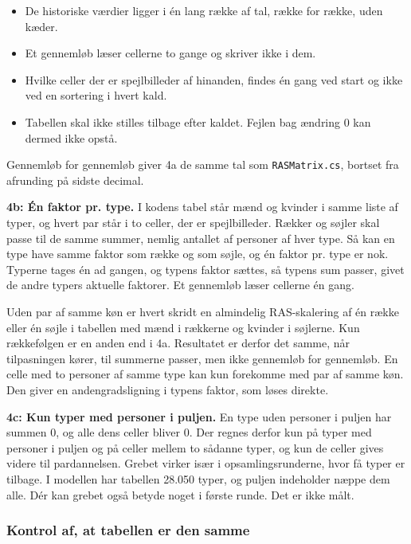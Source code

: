 \documentclass[11pt,a4paper]{article}
\newcommand{\kode}[1]{\texttt{#1}}
\begin{document}
\begin{itemize}
\item De historiske værdier ligger i én lang række af tal, række for række, uden kæder.
\item Et gennemløb læser cellerne to gange og skriver ikke i dem.
\item Hvilke celler der er spejlbilleder af hinanden, findes én gang ved start og ikke ved en
sortering i hvert kald.
\item Tabellen skal ikke stilles tilbage efter kaldet. Fejlen bag ændring 0 kan dermed ikke opstå.
\end{itemize}

Gennemløb for gennemløb giver 4a de samme tal som \kode{RASMatrix.cs}, bortset fra afrunding på
sidste decimal.

\textbf{4b: Én faktor pr. type.} I kodens tabel står mænd og kvinder i samme liste af typer, og
hvert par står i to celler, der er spejlbilleder. Rækker og søjler skal passe til de samme summer,
nemlig antallet af personer af hver type. Så kan en type have samme faktor som række og som søjle,
og én faktor pr. type er nok. Typerne tages én ad gangen, og typens faktor sættes, så typens sum
passer, givet de andre typers aktuelle faktorer. Et gennemløb læser cellerne én gang.

Uden par af samme køn er hvert skridt en almindelig RAS-skalering af én række eller én søjle i
tabellen med mænd i rækkerne og kvinder i søjlerne. Kun rækkefølgen er en anden end i 4a.
Resultatet er derfor det samme, når tilpasningen kører, til summerne passer, men ikke gennemløb for
gennemløb. En celle med to personer af samme type kan kun forekomme med par af samme køn. Den giver
en andengradsligning i typens faktor, som løses direkte.

\textbf{4c: Kun typer med personer i puljen.} En type uden personer i puljen har summen 0, og alle
dens celler bliver 0. Der regnes derfor kun på typer med personer i puljen og på celler mellem to
sådanne typer, og kun de celler gives videre til pardannelsen. Grebet virker især i
opsamlingsrunderne, hvor få typer er tilbage. I modellen har tabellen 28.050 typer, og puljen
indeholder næppe dem alle. Dér kan grebet også betyde noget i første runde. Det er ikke målt.

\subsubsection*{Kontrol af, at tabellen er den samme}
\end{document}
